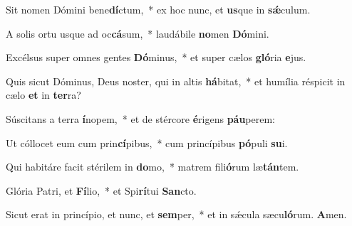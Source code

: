 \item Sit nomen Dómini bene\textbf{dí}ctum,~* ex hoc nunc, et \textbf{us}que in \textbf{sǽ}culum.

\item A solis ortu usque ad oc\textbf{cá}sum,~* laudábile \textbf{no}men \textbf{Dó}mini.

\item Excélsus super omnes gentes \textbf{Dó}minus,~* et super cælos \textbf{gló}ria \textbf{e}jus.

\item Quis sicut Dóminus, Deus noster, qui in altis \textbf{há}bitat,~* et humília réspicit in cælo \textbf{et} in \textbf{ter}ra?

\item Súscitans a terra \textbf{í}nopem,~* et de stércore \textbf{é}rigens \textbf{páu}perem:

\item Ut cóllocet eum cum prin\textbf{cí}pibus,~* cum princípibus \textbf{pó}puli \textbf{su}i.

\item Qui habitáre facit stérilem in \textbf{do}mo,~* matrem fili\textbf{ó}rum læ\textbf{tán}tem.

\item Glória Patri, et \textbf{Fí}lio,~* et Spi\textbf{rí}tui \textbf{San}cto.

\item Sicut erat in princípio, et nunc, et \textbf{sem}per,~* et in sǽcula sæcu\textbf{ló}rum. \textbf{A}men.
